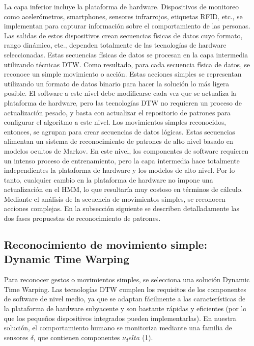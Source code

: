 \documentclass[a4paper]{article}
\begin{document}
La capa inferior incluye la plataforma de hardware. Dispositivos de monitoreo como acelerómetros, smartphones, sensores infrarrojos, etiquetas RFID, etc., se implementan para capturar información sobre el comportamiento de las personas. Las salidas de estos dispositivos crean secuencias físicas de datos cuyo formato, rango dinámico, etc., dependen totalmente de las tecnologías de hardware seleccionadas.
Estas secuencias físicas de datos se procesan en la capa intermedia utilizando técnicas DTW. Como resultado, para cada secuencia física de datos, se reconoce un simple movimiento o acción. Estas acciones simples se representan utilizando un formato de datos binario para hacer la solución lo más ligera posible. El software a este nivel debe modificarse cada vez que se actualiza la plataforma de hardware, pero las tecnologías DTW no requieren un proceso de actualización pesado, y basta con actualizar el repositorio de patrones para configurar el algoritmo a este nivel.
Los movimientos simples reconocidos, entonces, se agrupan para crear secuencias de datos lógicas. Estas secuencias alimentan un sistema de reconocimiento de patrones de alto nivel basado en modelos ocultos de Markov. En este nivel, los componentes de software requieren un intenso proceso de entrenamiento, pero la capa intermedia hace totalmente independientes la plataforma de hardware y los modelos de alto nivel. Por lo tanto, cualquier cambio en la plataforma de hardware no impone una actualización en el HMM, lo que resultaría muy costoso en términos de cálculo. Mediante el análisis de la secuencia de movimientos simples, se reconocen acciones complejas.
En la subsección siguiente se describen detalladamente las dos fases propuestas de reconocimiento de patrones.

\subsection{Reconocimiento de movimiento simple: Dynamic Time Warping}

Para reconocer gestos o movimientos simples, se selecciona una solución Dynamic Time Warping. Las tecnologías DTW cumplen los requisitos de los componentes de software de nivel medio, ya que se adaptan fácilmente a las características de la plataforma de hardware subyacente y son bastante rápidas y eficientes (por lo que los pequeños dispositivos integrados pueden implementarlas).
En nuestra solución, el comportamiento humano se monitoriza mediante una familia de sensores $\delta$, que contienen componentes  $\nu_delta$  (1).
\end{document}
